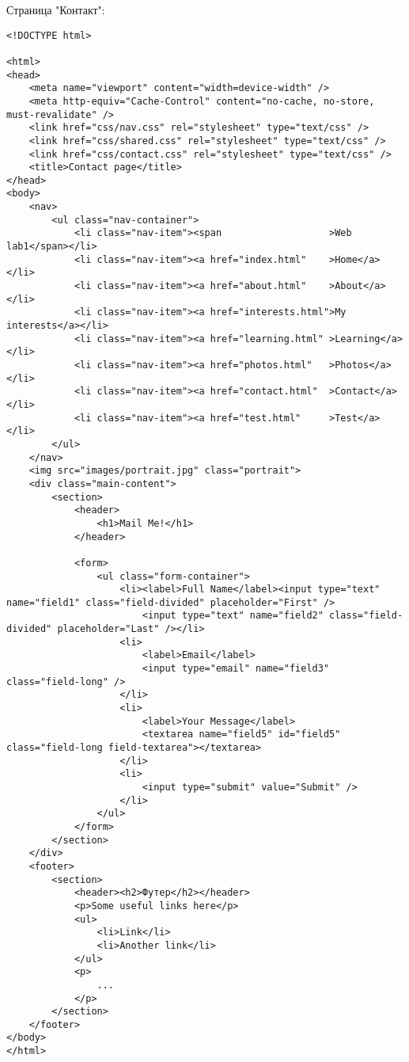 Страница "Контакт":
\begin{lstlisting}
<!DOCTYPE html>

<html>
<head>
    <meta name="viewport" content="width=device-width" />
    <meta http-equiv="Cache-Control" content="no-cache, no-store, must-revalidate" />
    <link href="css/nav.css" rel="stylesheet" type="text/css" />
    <link href="css/shared.css" rel="stylesheet" type="text/css" />
    <link href="css/contact.css" rel="stylesheet" type="text/css" />
    <title>Contact page</title>
</head>
<body>
    <nav>
        <ul class="nav-container">
            <li class="nav-item"><span                   >Web lab1</span></li>
            <li class="nav-item"><a href="index.html"    >Home</a></li>
            <li class="nav-item"><a href="about.html"    >About</a></li>
            <li class="nav-item"><a href="interests.html">My interests</a></li>
            <li class="nav-item"><a href="learning.html" >Learning</a></li>
            <li class="nav-item"><a href="photos.html"   >Photos</a></li>
            <li class="nav-item"><a href="contact.html"  >Contact</a></li>
            <li class="nav-item"><a href="test.html"     >Test</a></li>
        </ul>
    </nav>
    <img src="images/portrait.jpg" class="portrait">
    <div class="main-content">
        <section>
            <header>
                <h1>Mail Me!</h1>
            </header>

            <form>
                <ul class="form-container">
                    <li><label>Full Name</label><input type="text" name="field1" class="field-divided" placeholder="First" />
                        <input type="text" name="field2" class="field-divided" placeholder="Last" /></li>
                    <li>
                        <label>Email</label>
                        <input type="email" name="field3" class="field-long" />
                    </li>
                    <li>
                        <label>Your Message</label>
                        <textarea name="field5" id="field5" class="field-long field-textarea"></textarea>
                    </li>
                    <li>
                        <input type="submit" value="Submit" />
                    </li>
                </ul>
            </form>
        </section>
    </div>
    <footer>
        <section>
            <header><h2>Футер</h2></header>
            <p>Some useful links here</p>
            <ul>
                <li>Link</li>
                <li>Another link</li>
            </ul>
            <p>
                ...
            </p>
        </section>
    </footer>
</body>
</html>
\end{lstlisting}

